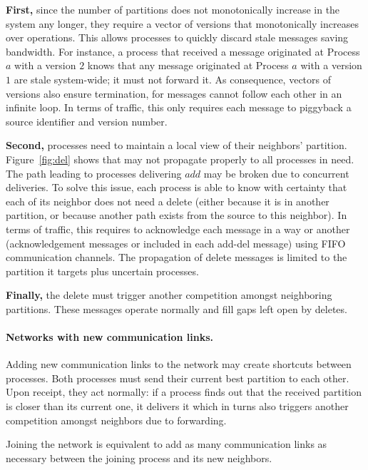 \noindent \textbf{First,} since the number of partitions does not
monotonically increase in the system any longer, they require a vector
of versions that monotonically increases over 
operations. This allows processes to quickly discard stale messages
saving bandwidth. For instance, a process that received a message
originated at Process $a$ with a version $2$ knows that any message
originated at Process $a$ with a version $1$ are stale system-wide; it
must not forward it. As consequence, vectors of versions also ensure
termination, for messages  cannot follow each other
in an infinite loop. In terms of traffic, this only requires each
 message to piggyback a source identifier and version
number.

\noindent \textbf{Second,} processes need to maintain a local view of
their neighbors' partition.  Figure~\ref{fig:del} shows that
 may not propagate properly to all processes in
need. The path leading to processes delivering $add$ may be broken due
to concurrent deliveries.  To solve this issue, each process is able
to know with certainty that each of its neighbor does not need a
delete (either because it is in another partition, or because another
path exists from the source to this neighbor).  In terms of traffic, this requires to acknowledge each message
in a way or another (acknowledgement messages or included in each
add-del message) using FIFO communication channels. The propagation of
delete messages is limited to the partition it targets plus uncertain
processes.

\noindent \textbf{Finally,} the delete must trigger another
competition amongst neighboring partitions. These 
messages operate normally and fill gaps left open by deletes.

\paragraph{Networks with new communication links.}
Adding new communication links to the network may create shortcuts
between processes. Both processes must send their current best
partition to each other. Upon receipt, they act normally: if a process
finds out that the received partition is closer than its current one,
it delivers it which in turns also triggers another competition
amongst neighbors due to forwarding.

\noindent Joining the network is equivalent to add as many
communication links as necessary between the joining process and its
new neighbors.


